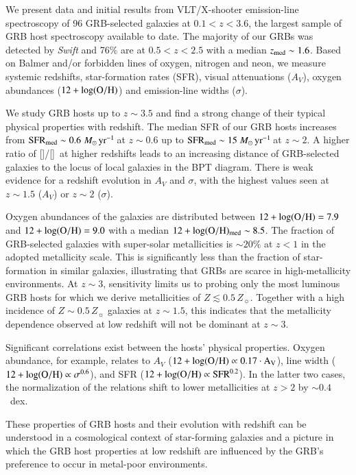 \documentclass[traditabstract, longauth]{aa}
\newcommand{\oh}{12+\log(\rm{O/H})}
\newcommand{\oii}{[\ion{O}{ii}]}
\newcommand{\oiii}{[\ion{O}{iii}]}
\newcommand{\Msunyr}{$M_\odot\,\rm{yr}^{-1}$}
\begin{document}
\abstract
{We present data and initial results from VLT/X-shooter emission-line spectroscopy of  {96} GRB-selected galaxies at $0.1<z<3.6$, the largest sample of GRB host spectroscopy available to date. The majority of our GRBs was detected by \textit{Swift} and 76\% are at $0.5<z<2.5$ with a median $z_{\rm{med}}\sim1.6$. Based on Balmer and/or forbidden lines of oxygen, nitrogen and neon, we measure systemic redshifts, star-formation rates (SFR), visual attenuations ($A_V$), oxygen abundances ($\oh$) and emission-line widths ($\sigma$). 

We study GRB hosts up to $z\sim3.5$ and find a strong change of their typical physical properties with redshift. The median SFR of our GRB hosts increases from $\rm{SFR_{med}}\sim0.6$\,\Msunyr\,at $z\sim0.6$ up to $\rm{SFR_{med}}\sim15$\,\Msunyr\,at $z\sim2$. A higher ratio of \oiii/\oii\, at higher redshifts leads to an increasing distance of GRB-selected galaxies to the locus of local galaxies in the BPT diagram. There is weak evidence for a redshift evolution in $A_V$ and $\sigma$, with the highest values seen at $z\sim1.5$ ($A_V$) or $z\sim2$ ($\sigma$). 

 {Oxygen abundances of the galaxies are distributed between $\oh=7.9$ and $\oh=9.0$ with a median $\oh_{\rm{med}}\sim 8.5$. The fraction of GRB-selected galaxies with super-solar metallicities is $\sim 20\%$ at $z<1$ in the adopted metallicity scale.}  This is significantly less than the fraction of star-formation in similar galaxies, illustrating that GRBs are scarce in high-metallicity environments. At $z\sim3$, sensitivity limits us to probing only the most luminous GRB hosts for which we derive metallicities of $Z\lesssim0.5\,Z_{\sun}$. Together with a high incidence of $Z\sim0.5\,Z_{\sun}$ galaxies at $z\sim1.5$, this indicates that the metallicity dependence observed at low redshift will not be dominant at $z\sim3$.

Significant correlations exist between the hosts' physical properties. Oxygen abundance, for example, relates to $A_V$ ($\oh \propto 0.17\cdot A_V$), line width ($\oh \propto\sigma^{0.6}$), and SFR ($\oh\propto\mathrm{SFR}^{0.2}$). In the latter two cases, the normalization of the relations shift to lower metallicities at $z>2$ by $\sim0.4$~dex. 

These properties of GRB hosts and their evolution with redshift can be understood in a cosmological context of star-forming galaxies and a picture in which the GRB host properties at low redshift are influenced by the GRB's preference to occur in metal-poor environments.}
\end{document}
